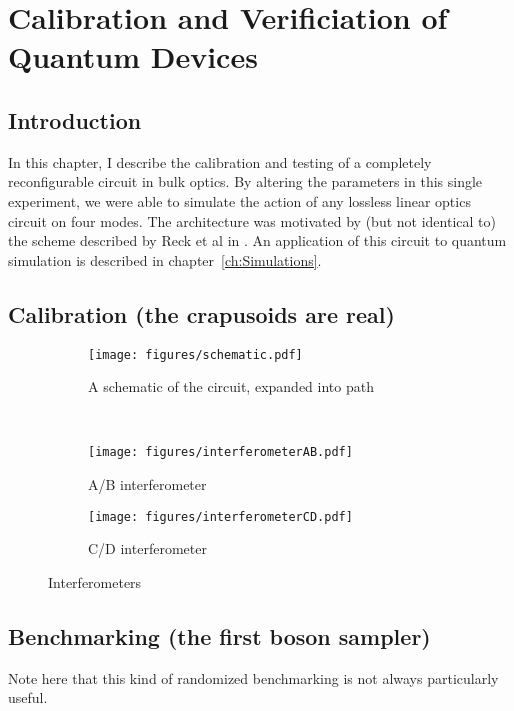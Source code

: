 \chapter{Calibration and Verificiation of Quantum Devices}
\label{ch:QCV}

\section{Introduction}
\label{sec:QCVIntro}
In this chapter, I describe the calibration and testing of a completely
reconfigurable circuit in bulk optics. By altering the parameters in this single
experiment, we were able to simulate the action of any lossless linear optics
circuit on four modes. The architecture was motivated by (but not identical to)
the scheme described by Reck et al in \cite{reck}. An application of this
circuit to quantum simulation is described in chapter~\ref{ch:Simulations}.

\section{Calibration (the crapusoids are real)}
\label{sec:Calibration}
\begin{figure}
  \centering
  \begin{subfigure}{\textwidth}
    \texttt{[image: figures/schematic.pdf]}
    \caption{A schematic of the circuit, expanded into path}
    \label{fig:schematic}
  \end{subfigure} \\
  \vspace{1cm}
  \begin{subfigure}{0.45\textwidth}
    \texttt{[image: figures/interferometerAB.pdf]}
    \caption{A/B interferometer}
    \label{fig:ab}
  \end{subfigure}
  \hspace{0.05\textwidth}
  \begin{subfigure}{0.45\textwidth}
    \texttt{[image: figures/interferometerCD.pdf]}
    \caption{C/D interferometer}
    \label{fig:cd}
  \end{subfigure}
  \caption[Illustration of nested interferometers in the bulk Reck scheme]
  {Interferometers}
  \label{fig:interferometers}
\end{figure}

\section{Benchmarking (the first boson sampler)}
\label{sec:Benchmarking}
Note here that this kind of randomized benchmarking is not always particularly
useful.

